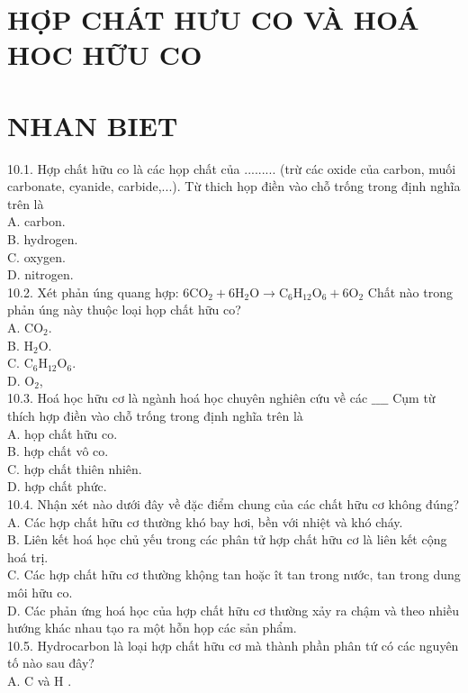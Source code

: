 \documentclass[10pt]{article}
\begin{document}
\section*{HỢP CHÁT HƯU CO VÀ HOÁ HOC HỮU CO}
\section*{NHAN BIET}
10.1. Hợp chất hữu co là các họp chất của ......... (trừ các oxide của carbon, muối carbonate, cyanide, carbide,...). Từ thich họp điền vào chỗ trống trong định nghĩa trên là\\
A. carbon.\\
B. hydrogen.\\
C. oxygen.\\
D. nitrogen.\\
10.2. Xét phản úng quang hợp: $6 \mathrm{CO}_{2}+6 \mathrm{H}_{2} \mathrm{O} \longrightarrow \mathrm{C}_{6} \mathrm{H}_{12} \mathrm{O}_{6}+6 \mathrm{O}_{2}$ Chất nào trong phản úng này thuộc loại họp chất hữu co?\\
A. $\mathrm{CO}_{2}$.\\
B. $\mathrm{H}_{2} \mathrm{O}$.\\
C. $\mathrm{C}_{6} \mathrm{H}_{12} \mathrm{O}_{6}$.\\
D. $\mathrm{O}_{2}$,\\
10.3. Hoá học hữu cơ là ngành hoá học chuyên nghiên cứu về các $\_\_\_\_$ Cụm từ thích hợp điền vào chỗ trống trong định nghĩa trên là\\
A. họp chất hữu co.\\
B. hợp chất vô co.\\
C. hợp chất thiên nhiên.\\
D. hợp chất phức.\\
10.4. Nhận xét nào dưới đây về đặc điểm chung của các chất hữu cơ không đúng?\\
A. Các hợp chất hữu cơ thường khó bay hơi, bền với nhiệt và khó cháy.\\
B. Liên kết hoá học chủ yếu trong các phân tử hợp chất hữu cơ là liên kết cộng hoá trị.\\
C. Các hợp chất hữu cơ thường khộng tan hoặc ît tan trong nước, tan trong dung môi hữu co.\\
D. Các phản ứng hoá học của hợp chất hữu cơ thường xảy ra chậm và theo nhiều hướng khác nhau tạo ra một hỗn họp các sản phẩm.\\
10.5. Hydrocarbon là loại hợp chất hữu cơ mà thành phần phân tứ có các nguyên tố nào sau đây?\\
A. C và H .\\
\end{document}
